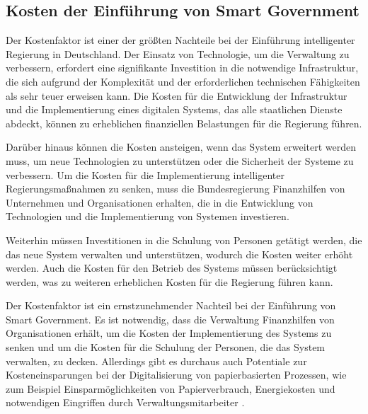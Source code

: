 \subsection{Kosten der Einführung von Smart Government}
Der Kostenfaktor ist einer der größten Nachteile bei der Einführung intelligenter Regierung in Deutschland.
Der Einsatz von Technologie, um die Verwaltung zu verbessern, erfordert eine signifikante Investition in die notwendige Infrastruktur, die sich aufgrund der Komplexität und der erforderlichen technischen Fähigkeiten als sehr teuer erweisen kann.
Die Kosten für die Entwicklung der Infrastruktur und die Implementierung eines digitalen Systems, das alle staatlichen Dienste abdeckt, können zu erheblichen finanziellen Belastungen für die Regierung führen.
\par
Darüber hinaus können die Kosten ansteigen, wenn das System erweitert werden muss, um neue Technologien zu unterstützen oder die Sicherheit der Systeme zu verbessern.
Um die Kosten für die Implementierung intelligenter Regierungsmaßnahmen zu senken, muss die Bundesregierung Finanzhilfen von Unternehmen und Organisationen erhalten, die in die Entwicklung von Technologien und die Implementierung von Systemen investieren.
\par
Weiterhin müssen Investitionen in die Schulung von Personen getätigt werden, die das neue System verwalten und unterstützen, wodurch die Kosten weiter erhöht werden.
Auch die Kosten für den Betrieb des Systems müssen berücksichtigt werden, was zu weiteren erheblichen Kosten für die Regierung führen kann.
\par
Der Kostenfaktor ist ein ernstzunehmender Nachteil bei der Einführung von Smart Government.
Es ist notwendig, dass die Verwaltung Finanzhilfen von Organisationen erhält, um die Kosten der Implementierung des Systems zu senken und um die Kosten für die Schulung der Personen, die das System verwalten, zu decken.
Allerdings gibt es durchaus auch Potentiale zur Kosteneinsparungen bei der Digitalisierung von papierbasierten Prozessen, wie zum Beispiel Einsparmöglichkeiten von Papierverbrauch, Energiekosten und notwendigen Eingriffen durch Verwaltungsmitarbeiter \citep[Vgl.][S.179]{von_Lucke_2016}.